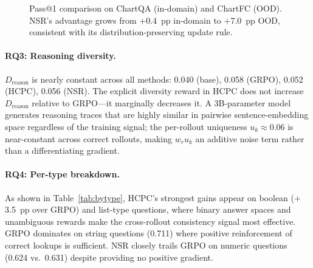 \documentclass[11pt]{article}
\newcommand{\hcpc}{\textsc{HCPC}}
\newcommand{\grpo}{\textsc{GRPO}}
\newcommand{\nsr}{\textsc{NSR}}
\begin{document}
\begin{figure}[t]
\centering
{}
\vspace{-0.25cm}
\caption{Pass@1 comparison on ChartQA (in-domain) and ChartFC (OOD).
  \nsr{}'s advantage grows from $+$0.4~pp in-domain to $+$7.0~pp OOD,
  consistent with its distribution-preserving update rule.}
\label{fig:p1}
\vspace{-0.3cm}
\end{figure}

\paragraph{RQ3: Reasoning diversity.}
$D_\text{reason}$ is nearly constant across all methods: 0.040 (base),
0.058 (\grpo), 0.052 (\hcpc), 0.056 (\nsr).
The explicit diversity reward in \hcpc{} does not increase $D_\text{reason}$
relative to \grpo---it marginally decreases it.
A 3B-parameter model generates reasoning traces that are highly similar in
pairwise sentence-embedding space regardless of the training signal; the
per-rollout uniqueness $u_k \approx 0.06$ is near-constant across correct rollouts,
making $w_r u_k$ an additive noise term rather than a differentiating gradient.

\paragraph{RQ4: Per-type breakdown.}
As shown in Table~\ref{tab:bytype}, \hcpc{}'s strongest gains appear on boolean
($+$3.5~pp over \grpo) and list-type questions, where binary answer spaces and
unambiguous rewards make the cross-rollout consistency signal most effective.
\grpo{} dominates on string questions (0.711) where positive reinforcement of
correct lookups is sufficient.
\nsr{} closely trails \grpo{} on numeric questions (0.624 vs.\ 0.631) despite
providing no positive gradient.
\end{document}

